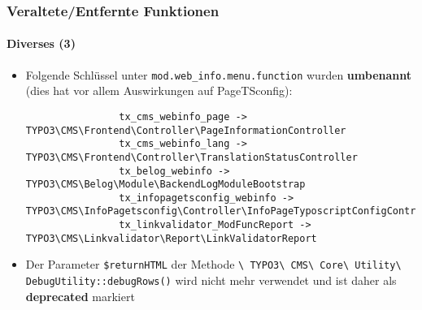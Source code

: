 \begin{frame}[fragile]
	\frametitle{Veraltete/Entfernte Funktionen}
	\framesubtitle{Diverses (3)}

	\lstset{basicstyle=\tiny\ttfamily}

	\begin{itemize}

		\item Folgende Schlüssel unter \texttt{mod.web\_info.menu.function} wurden \textbf{umbenannt}
			(dies hat vor allem Auswirkungen auf PageTSconfig):

			\begin{lstlisting}
				tx_cms_webinfo_page -> TYPO3\CMS\Frontend\Controller\PageInformationController
				tx_cms_webinfo_lang -> TYPO3\CMS\Frontend\Controller\TranslationStatusController
				tx_belog_webinfo -> TYPO3\CMS\Belog\Module\BackendLogModuleBootstrap
				tx_infopagetsconfig_webinfo -> TYPO3\CMS\InfoPagetsconfig\Controller\InfoPageTyposcriptConfigController
				tx_linkvalidator_ModFuncReport -> TYPO3\CMS\Linkvalidator\Report\LinkValidatorReport
			\end{lstlisting}

		\item Der Parameter \texttt{\$returnHTML} der Methode
			\small
				\texttt{\textbackslash
					TYPO3\textbackslash
					CMS\textbackslash
					Core\textbackslash
					Utility\textbackslash
					DebugUtility::debugRows()}
			\normalsize
			wird nicht mehr verwendet und ist daher als \textbf{deprecated} markiert

	\end{itemize}

\end{frame}


